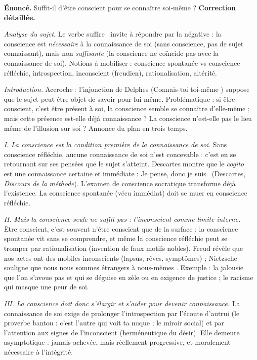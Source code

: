 \documentclass[11pt]{article}
\begin{document}
\begin{exoresolu}
\textbf{Énoncé.} Suffit-il d'être conscient pour se connaître soi-même ?
\tcblower
\textbf{Correction détaillée.}

\emph{Analyse du sujet.} Le verbe \guillemotleft suffire \guillemotright\ invite à répondre par la négative : la conscience est \emph{nécessaire} à la connaissance de soi (sans conscience, pas de sujet connaissant), mais non \emph{suffisante} (la conscience ne coïncide pas avec la connaissance de soi). Notions à mobiliser : conscience spontanée vs conscience réfléchie, introspection, inconscient (freudien), rationalisation, altérité.

\emph{Introduction.} Accroche : l'injonction de Delphes (\guillemotleft Connais-toi toi-même \guillemotright) suppose que le sujet peut être objet de savoir pour lui-même. Problématique : si être conscient, c'est être présent à soi, la conscience semble se connaître d'elle-même ; mais cette présence est-elle déjà connaissance ? La conscience n'est-elle pas le lieu même de l'illusion sur soi ? Annonce du plan en trois temps.

\emph{I. La conscience est la condition première de la connaissance de soi.} Sans conscience réfléchie, aucune connaissance de soi n'est concevable : c'est en se retournant sur ses pensées que le sujet s'atteint. Descartes montre que le \emph{cogito} est une connaissance certaine et immédiate : \guillemotleft Je pense, donc je suis \guillemotright\ (Descartes, \emph{Discours de la méthode}). L'examen de conscience socratique transforme déjà l'existence. La conscience spontanée (vécu immédiat) doit se muer en conscience réfléchie.

\emph{II. Mais la conscience seule ne suffit pas : l'inconscient comme limite interne.} Être conscient, c'est souvent n'être conscient que de la surface : la conscience spontanée vit sans se comprendre, et même la conscience réfléchie peut se tromper par rationalisation (invention de faux motifs nobles). Freud révèle que nos actes ont des mobiles inconscients (lapsus, rêves, symptômes) ; Nietzsche souligne que \guillemotleft nous nous sommes étrangers à nous-mêmes \guillemotright. Exemple : la jalousie que l'on s'avoue pas et qui se déguise en zèle ou en exigence de justice ; le racisme qui masque une peur de soi.

\emph{III. La conscience doit donc s'élargir et s'aider pour devenir connaissance.} La connaissance de soi exige de prolonger l'introspection par l'écoute d'autrui (le proverbe bantou : \guillemotleft c'est l'autre qui voit ta nuque \guillemotright ; le miroir social) et par l'attention aux signes de l'inconscient (herméneutique du désir). Elle demeure asymptotique : jamais achevée, mais réellement progressive, et moralement nécessaire à l'intégrité.


\end{exoresolu}
\end{document}
